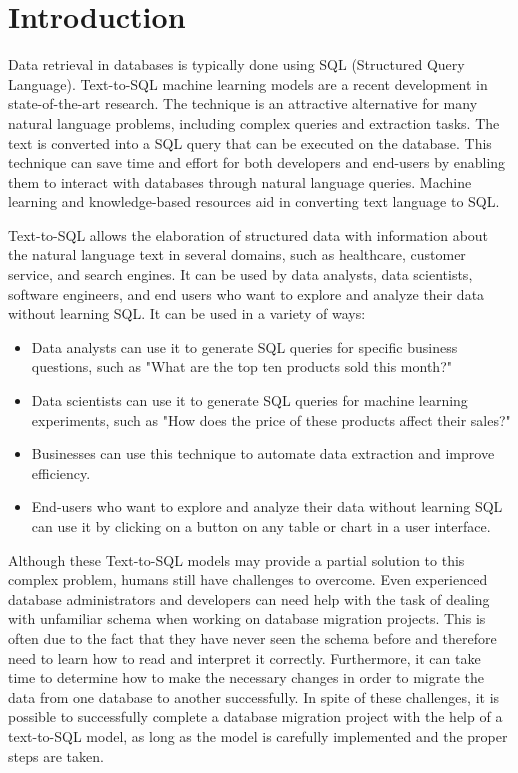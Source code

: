 \section{Introduction}

Data retrieval in databases is typically done using SQL (Structured Query Language). Text-to-SQL machine learning models are a recent development in state-of-the-art research. The technique is an attractive alternative for many natural language problems, including complex queries and extraction tasks. The text is converted into a SQL query that can be executed on the database. This technique can save time and effort for both developers and end-users by enabling them to interact with databases through natural language queries. Machine learning and knowledge-based resources aid in converting text language to SQL.

Text-to-SQL allows the elaboration of structured data with information about the natural language text in several domains, such as healthcare, customer service, and search engines. It can be used by data analysts, data scientists, software engineers, and end users who want to explore and analyze their data without learning SQL. It can be used in a variety of ways:

\begin{itemize}
    \item Data analysts can use it to generate SQL queries for specific business questions, such as "What are the top ten products sold this month?"
    \item Data scientists can use it to generate SQL queries for machine learning experiments, such as "How does the price of these products affect their sales?"
    \item Businesses can use this technique to automate data extraction and improve efficiency.
    \item End-users who want to explore and analyze their data without learning SQL can use it by clicking on a button on any table or chart in a user interface.
\end{itemize}

Although these Text-to-SQL models may provide a partial solution to this complex problem, humans still have challenges to overcome. Even experienced database administrators and developers can need help with the task of dealing with unfamiliar schema when working on database migration projects. This is often due to the fact that they have never seen the schema before and therefore need to learn how to read and interpret it correctly. Furthermore, it can take time to determine how to make the necessary changes in order to migrate the data from one database to another successfully. In spite of these challenges, it is possible to successfully complete a database migration project with the help of a text-to-SQL model, as long as the model is carefully implemented and the proper steps are taken.

